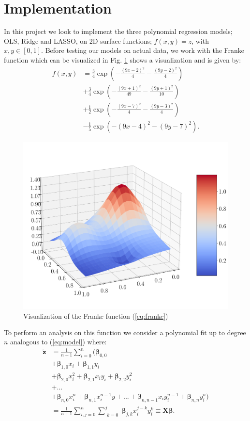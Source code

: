 \documentclass[%
reprint,
amsmath,amssymb,
aps,
pra,
]{revtex4-2}
\newcommand{\f}[2]{\frac{#1}{#2}}
\begin{document}
\section{Implementation}
In this project we look to implement the three polynomial regression models; OLS, Ridge and  LASSO, on 2D surface functions; \(f(x,y)=z\), with \(x,y\in[0,1]\). Before testing our models on actual data, we work with the Franke function which can be visualized in Fig. \ref{fig:frankefunction} shows a visualization and is given by:
\begin{align}	\label{eq:franke}
	f(x,y)&=\frac{3}{4}\exp(-\frac{(9x-2)^2}{4}-\frac{(9y-2)^2}{4})\nonumber\\
	&+\frac{3}{4}\exp(-\frac{(9x+1)^2}{49}-\frac{(9y+1)^2}{10})\nonumber\\
	&+\frac{1}{2}\exp(-\frac{(9x-7)^2}{4}-\frac{(9y-3)^2}{4})\nonumber\\
	&-\frac{1}{5}\exp(-(9x-4)^2-(9y-7)^2).
\end{align}
\begin{figure}[H]
	\includegraphics[width=\linewidth]{Python/Figures/FrankeFunction.pdf}
	\caption{Visualization of the Franke function (\ref{eq:franke})}
	\label{fig:frankefunction}
\end{figure}
To perform an analysis on this function we consider a polynomial fit up to degree $n$ analogous to (\ref{eq:model}) where:
\begin{align}
	\tilde{\bm{z}}&=\f1{n+1}\sum_{i=0}^{n}\bigg(\bm\beta_{0,0}\nonumber\\
	&+\bm\beta_{1,0}x_i+\bm\beta_{1,1}y_i\nonumber\\
	&+\bm\beta_{2,0}x_i^2+\bm\beta_{2,1}x_iy_i+\bm\beta_{2,2}y_i^2\nonumber\\
	&+...\nonumber\\
	&+\bm\beta_{n,0}x_i^n+\bm\beta_{n,1}x_i^{n-1}y+...+\bm\beta_{n,n-1}x_iy_i^{n-1}+\bm\beta_{n,n}y_i^n\bigg)\nonumber\\
	&=\frac{1}{n+1}\sum_{i,j=0}^{n}\sum_{\substack{k=0}}^{j}\bm\beta_{j,k} x^{j-k}_i y^{k}_i\equiv \bm X\bm\beta.
	\label{eq:bmz}
\end{align}
\end{document}
